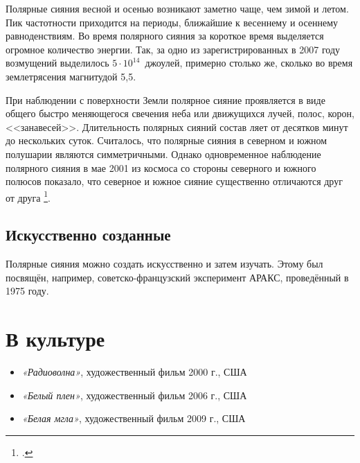 \documentclass[a4paper,14pt]{article}
\begin{document}
Полярные сияния весной и осенью возникают заметно чаще, чем зимой и летом. Пик частотности приходится на периоды, ближайшие к весеннему и осеннему равноденствиям. Во время полярного сияния за короткое время выделяется огромное количество энергии. Так, за одно из зарегистрированных в 2007 году возмущений выделилось $5\cdot10^{14}$~джоулей, примерно столько же, сколько во время землетрясения магнитудой 5,5.


При наблюдении с поверхности Земли полярное сияние проявляется в виде общего быстро меняющегося свечения неба или движущихся лучей, полос, корон, <<занавесей>>. Длительность полярных сияний состав ляет от десятков минут до нескольких суток. Считалось, что полярные сияния в северном и южном полушарии являются симметричными. Однако одновременное наблюдение полярного сияния в мае 2001 из космоса со стороны северного и южного полюсов показало, что северное и южное сияние существенно отличаются друг от друга \footcite[P. 20]{Kruesi2009Aurorae}. %

\subsection{Искусственно созданные}
Полярные сияния можно создать искусственно и затем изучать. Этому был посвящён, например, советско-французский эксперимент АРАКС, проведённый в 1975 году.

\section{В культуре}

\begin{itemize}[label=\textcolor{blue}{\textbullet}]
	\item \textit{«Радиоволна»}, художественный фильм 2000 г., США
	\item \textit{«Белый плен»}, художественный фильм 2006 г., США
	\item \textit{«Белая мгла»}, художественный фильм 2009 г., США
\end{itemize}

\nocite{*}
\renewcommand{\refname}{\hspace{1cm}Литература}  %
\addcontentsline{toc}{section}{\refname}
\printbibliography
\end{document}
